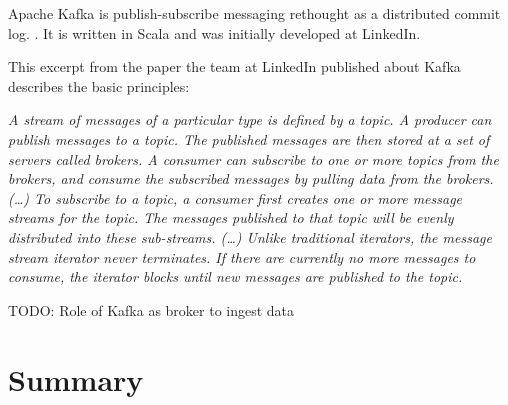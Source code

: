 Apache Kafka is publish-subscribe messaging rethought as a distributed commit log. \cite{Kafka16}.
It is written in Scala and was initially developed at LinkedIn.

This excerpt from the paper \cite{Neha11} the team at LinkedIn published about Kafka describes the
basic principles:

\textit{A stream of messages of a particular type is defined by a topic. A producer can publish
messages to a topic. The published messages are then stored at a set of servers called brokers.
A consumer can subscribe to one or more topics from the brokers, and consume the subscribed
messages by pulling data from the brokers. (…) To subscribe to a topic, a consumer first creates
one or more message streams for the topic. The messages published to that topic will be evenly
distributed into these sub-streams. (…)  Unlike traditional iterators, the message stream iterator
never terminates. If there are currently no more messages to consume, the iterator blocks until
new messages are published to the topic.}

TODO: Role of Kafka as broker to ingest data


%
%
%
%

%
%

\section{Summary}
